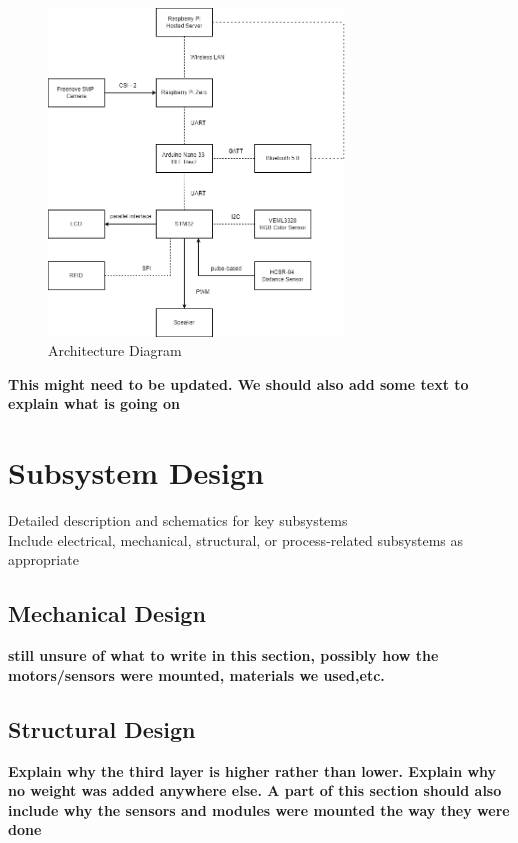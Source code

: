 \documentclass{article}
\begin{document}
\begin{figure}[H]
    \centering
    \includegraphics[width=0.7\textwidth]{Figures/Architecture_Diagram.png}
    \caption{Architecture Diagram}
    \label{fig:architecture_diagram}
\end{figure}

\textbf{This might need to be updated. We should also add some text to explain what is going on}

\section{Subsystem Design}
Detailed description and schematics for key subsystems \\
Include electrical, mechanical, structural, or process-related subsystems as appropriate


\subsection{Mechanical Design}

\textbf{still unsure of what to write in this section, possibly how the motors/sensors were mounted, materials we used,etc.}

\subsection{Structural Design}

\textbf{Explain why the third layer is higher rather than lower. Explain why no weight was added anywhere else. A part of this section should also include why the sensors and modules were mounted the way they were done}
\end{document}

